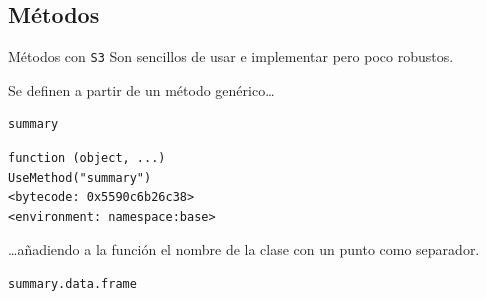\documentclass[xcolor={usenames,svgnames,dvipsnames}]{beamer}
\begin{document}
\subsection{Métodos}
\label{sec:org2c4d0fc}
\begin{frame}[label={sec:org4c6376d},fragile]{Métodos con \texttt{S3}}
 Son \alert{sencillos} de usar e implementar pero \alert{poco robustos}.

Se definen a partir de un método genérico\ldots{}
\lstset{language=r,label= ,caption= ,captionpos=b,numbers=none}
\begin{lstlisting}
summary
\end{lstlisting}

\begin{verbatim}
function (object, ...) 
UseMethod("summary")
<bytecode: 0x5590c6b26c38>
<environment: namespace:base>
\end{verbatim}


\ldots{}añadiendo a la función el nombre de la clase con un punto como separador. 
\lstset{language=r,label= ,caption= ,captionpos=b,numbers=none}
\begin{lstlisting}
summary.data.frame
\end{lstlisting}


\end{frame}
\end{document}
